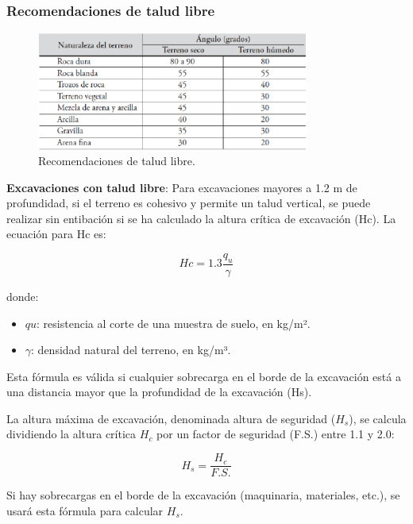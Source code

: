 \subsubsection{Recomendaciones de talud libre}

\begin{figure}[h]
    \centering
    \includegraphics[width=0.8\textwidth]{aaa.png}
    \caption{Recomendaciones de talud libre.}
    \label{fig:8_1}
\end{figure} 

\textbf{Excavaciones con talud libre}: Para excavaciones mayores a 1.2 m de profundidad, si el terreno es cohesivo y permite un talud vertical, se puede realizar sin entibación si se ha calculado la altura crítica de excavación (Hc). La ecuación para Hc es:

\[
Hc = 1.3 \frac{q_u}{\gamma}
\]

donde:
\begin{itemize}
    \item $qu$: resistencia al corte de una muestra de suelo, en kg/m².
    \item $\gamma$: densidad natural del terreno, en kg/m³.
\end{itemize}

Esta fórmula es válida si cualquier sobrecarga en el borde de la excavación está a una distancia mayor que la profundidad de la excavación (Hs).

La altura máxima de excavación, denominada altura de seguridad ($H_s$), se calcula dividiendo la altura crítica $H_c$ por un factor de seguridad (F.S.) entre 1.1 y 2.0:

\[
H_s = \frac{H_c}{F.S.}
\]

Si hay sobrecargas en el borde de la excavación (maquinaria, materiales, etc.), se usará esta fórmula para calcular $H_s$.
